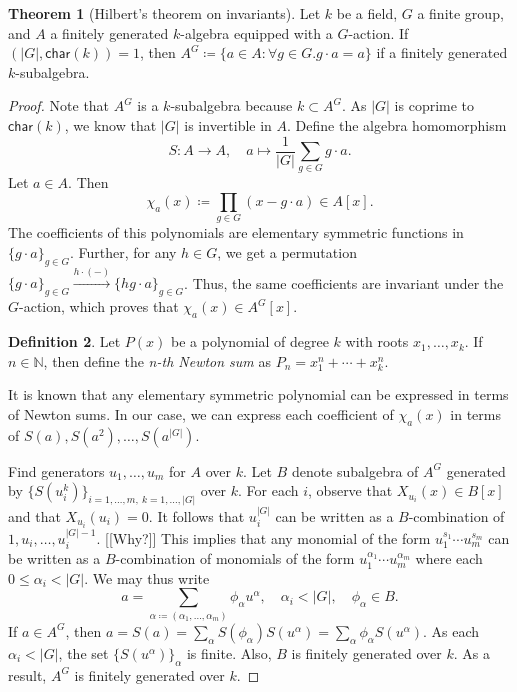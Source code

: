 \documentclass[10pt,letterpaper,cm]{nupset}
\theoremstyle{definition}
\newtheorem{definition}{Definition}[subsection]
\theoremstyle{theorem}
\newtheorem{theorem}[definition]{Theorem}
\theoremstyle{remark}
\newcommand{\N}{\mathbb N}
\newcommand{\1}{\mathbf{1}}
\newcommand{\0}{\vec 0}
\newcommand{\Char}{\mathsf{char}}
\begin{document}
\begin{theorem}[Hilbert's theorem on invariants]
Let $k$ be a field, $G$ a finite group, and $A$ a finitely generated $k$-algebra equipped with a $G$-action. If $(|G|, \Char(k))=1$, then $A^G\coloneqq  \{ a \in A: \forall g \in G.g\cdot a =a\}$ if a finitely generated $k$-subalgebra. 
\end{theorem}
\begin{proof}
Note that $A^G$ is a $k$-subalgebra because $k\subset A^G$. As $|G|$ is coprime to $\Char(k)$, we know that $|G|$ is invertible in $A$. Define the algebra homomorphism $$S: A \to A, \quad a \mapsto \frac{1}{|G|}\sum_{g\in G}g\cdot a   .$$ Let $a\in A$. Then $$\chi_a(x)\coloneqq  \prod_{g\in G}(x-g\cdot a)\in A[x].$$ The coefficients of this polynomials are elementary symmetric functions in $\{g\cdot a\}_{g\in G}$. Further, for any $h\in G$, we get a permutation $\{g\cdot a\}_{g\in G} \overset{h\cdot (-)}{\longrightarrow} \{h g\cdot a\}_{g\in G}$. Thus, the same coefficients are invariant under the $G$-action, which proves that $\chi_a(x) \in A^G[x]$. 
\begin{definition}
Let $P(x)$ be a polynomial of degree $k$ with roots $x_1, \ldots, x_k$. If $n\in \N$, then define the \textit{n-th Newton sum} as $P_n = x_1^n + \cdots + x_k^n$.
\end{definition}
It is known that any elementary symmetric polynomial can be expressed in terms of Newton sums. In our case, we can express each coefficient of $\chi_a(x)$ in terms of $S(a), S(a^2) , \ldots, S(a^{|G|})$.

Find generators $u_1, \ldots, u_m$ for $A$ over $k$. Let $B$ denote subalgebra of $A^G$ generated by $\{S(u_i^k)\}_{i=1, \ldots, m,\ k=1, \ldots, |G|}$ over $k$. For each $i$, observe that $X_{u_i}(x) \in B[x]$ and that $X_{u_i}(u_i) =0$. It follows that $u_i^{|G|}$ can be written as a $B$-combination of $1, u_i, \ldots, u_i^{|G|-1}$. {[[Why?]]} This implies that any monomial of the form $u_1^{s_1}\cdots u_m^{s_m}$ can be written as a $B$-combination of monomials of the form $u_1^{\alpha_1}\cdots u_m^{\alpha_m}$ where each $0\leq \alpha_i <|G|$. We may thus write $$a= \sum_{\alpha\coloneqq  (\alpha_1, \ldots, \alpha_m)}\phi_{\alpha}u^{\alpha}, \quad \alpha_i < |G|, \quad \phi_{\alpha} \in B.   $$ If $a\in A^G$, then $a=S(a) = \sum_{\alpha}S(\phi_{\alpha})S(u^{\alpha}) = \sum_{\alpha} \phi_{\alpha}S(u^{\alpha})$. As each $\alpha_i<|G|$,  the set $\{S(u^{\alpha})\}_{\alpha}$ is finite. Also, $B$ is finitely generated over $k$. As a result, $A^G$ is finitely generated over $k$. 
\end{proof}
\end{document}
